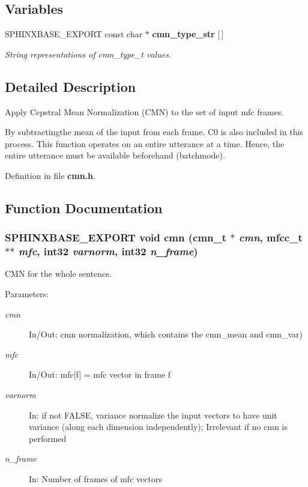 \subsection*{Variables}
\begin{CompactItemize}
\item 
SPHINXBASE\_\-EXPORT const char $\ast$ {\bf cmn\_\-type\_\-str} [$\,$]
\begin{CompactList}\small\item\em String representations of cmn\_\-type\_\-t values. \item\end{CompactList}\end{CompactItemize}


\subsection{Detailed Description}
Apply Cepstral Mean Normalization (CMN) to the set of input mfc frames. 

By subtractingthe mean of the input from each frame. C0 is also included in this process. This function operates on an entire utterance at a time. Hence, the entire utterance must be available beforehand (batchmode). 

Definition in file {\bf cmn.h}.

\subsection{Function Documentation}
\subsubsection[{cmn}]{\setlength{\rightskip}{0pt plus 5cm}SPHINXBASE\_\-EXPORT void cmn ({\bf cmn\_\-t} $\ast$ {\em cmn}, \/  mfcc\_\-t $\ast$$\ast$ {\em mfc}, \/  int32 {\em varnorm}, \/  int32 {\em n\_\-frame})}\label{cmn_8h_ccf10de8ef4d98b4bf591529cf16565e}


CMN for the whole sentence. 

\begin{Desc}
\item[Parameters: ]\par
\begin{description}
\item[{\em 
cmn}]In/Out: cmn normalization, which contains the cmn\_\-mean and cmn\_\-var) \item[{\em 
mfc}]In/Out: mfc[f] = mfc vector in frame f \item[{\em 
varnorm}]In: if not FALSE, variance normalize the input vectors to have unit variance (along each dimension independently); Irrelevant if no cmn is performed \item[{\em 
n\_\-frame}]In: Number of frames of mfc vectors \end{description}
\end{Desc}


